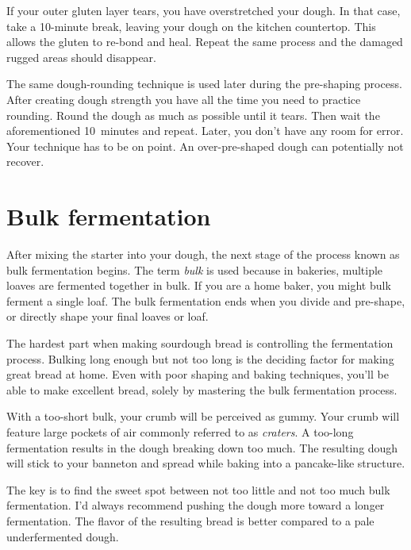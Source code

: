 If your outer gluten layer tears, you have overstretched your dough. In
that case, take a 10-minute break, leaving your dough on the kitchen countertop.
This allows the gluten to re-bond and heal. Repeat the same process
and the damaged rugged areas should disappear.

The same dough-rounding technique is used later during
the pre-shaping process. After creating dough strength you
have all the time you need to practice rounding. Round the dough
as much as possible until it tears. Then wait the aforementioned 10~minutes and repeat.
Later, you don't have any room for error. Your technique has to be on point.
An over-pre-shaped dough can potentially not recover.

\section{Bulk fermentation}%
\label{sec:bulk-fermentation}

After mixing the starter into your dough, the next stage of
the process known as bulk fermentation begins. The term
\emph{bulk} is used because in bakeries, multiple loaves are fermented
together in bulk. If you are a home baker, you might bulk
ferment a single loaf. The bulk fermentation ends when you
divide and pre-shape, or directly shape your final loaves or loaf.

The hardest part when making sourdough bread is controlling
the fermentation process. Bulking long enough but not too
long is the deciding factor for making great bread at home.
Even with poor shaping and baking techniques, you'll be able
to make excellent bread, solely by mastering the bulk
fermentation process.

With a too-short bulk, your crumb will be
perceived as gummy. Your crumb will feature large pockets of
air commonly referred to as \emph{craters}. A too-long fermentation
results in the dough breaking down too much. The resulting
dough will stick to your banneton and spread while baking
into a pancake-like structure.

The key is to find the sweet spot between not too little
and not too much bulk fermentation. I'd always recommend pushing
the dough more toward a longer fermentation. The
flavor of the resulting bread is better compared to a pale
underfermented dough.

\begin{table}[!htb]
    \centering
        
        \caption[Stages of sourdough fermentation]{The different stages of
            sourdough fermentation and the effects on crumb, alveoli, texture,
            and overall taste.}
\end{table}

